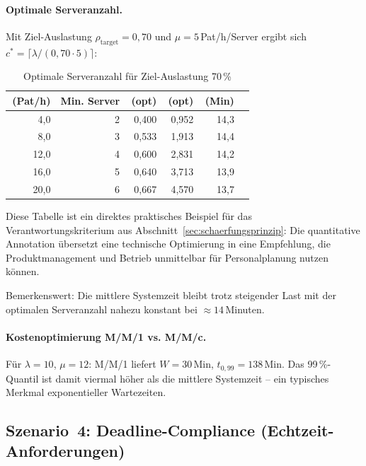 ﻿\documentclass[a4paper,12pt]{report}
\theoremstyle{definition}
\begin{document}
\paragraph{Optimale Serveranzahl.}
Mit Ziel-Auslastung $\rho_\text{target} = 0{,}70$ und $\mu = 5$\,Pat/h/Server
ergibt sich $c^* = \lceil \lambda / (0{,}70 \cdot 5) \rceil$:

\begin{table}[H]
	\centering
	\begin{tabular}{@{}rrrrrr@{}}
		\toprule
		\boldmath{$\lambda$}\,{\small(Pat/h)} & \textbf{Min. Server} & \boldmath{$\rho$}\,{\small(opt)} &
		\boldmath{$L$}\,{\small(opt)} & \boldmath{$W$}\,{\small(Min)} \\
		\midrule
		4{,}0 & 2 & 0{,}400 & 0{,}952 & 14{,}3 \\
		8{,}0 & 3 & 0{,}533 & 1{,}913 & 14{,}4 \\
		12{,}0 & 4 & 0{,}600 & 2{,}831 & 14{,}2 \\
		16{,}0 & 5 & 0{,}640 & 3{,}713 & 13{,}9 \\
		20{,}0 & 6 & 0{,}667 & 4{,}570 & 13{,}7 \\
		\bottomrule
	\end{tabular}
	\caption{Optimale Serveranzahl für Ziel-Auslastung 70\,\%}
\label{tab:optimale-server}
	\label{tab:capacity-planning}
\end{table}

Diese Tabelle ist ein direktes praktisches Beispiel für das Verantwortungskriterium aus Abschnitt~\ref{sec:schaerfungsprinzip}: Die quantitative Annotation übersetzt eine technische Optimierung in eine Empfehlung, die Produktmanagement und Betrieb unmittelbar für Personalplanung nutzen können.

Bemerkenswert: Die mittlere Systemzeit bleibt trotz steigender Last mit der
optimalen Serveranzahl nahezu konstant bei $\approx 14$\,Minuten.

\paragraph{Kostenoptimierung M/M/1 vs. M/M/c.}
Für $\lambda = 10$, $\mu = 12$: M/M/1 liefert $W = 30$\,Min,
$t_{0{,}99} = 138$\,Min. Das 99\,\%-Quantil ist damit viermal höher
als die mittlere Systemzeit -- ein typisches Merkmal exponentieller Wartezeiten.

\subsection{Szenario~4: Deadline-Compliance (Echtzeit-Anforderungen)}
\end{document}
